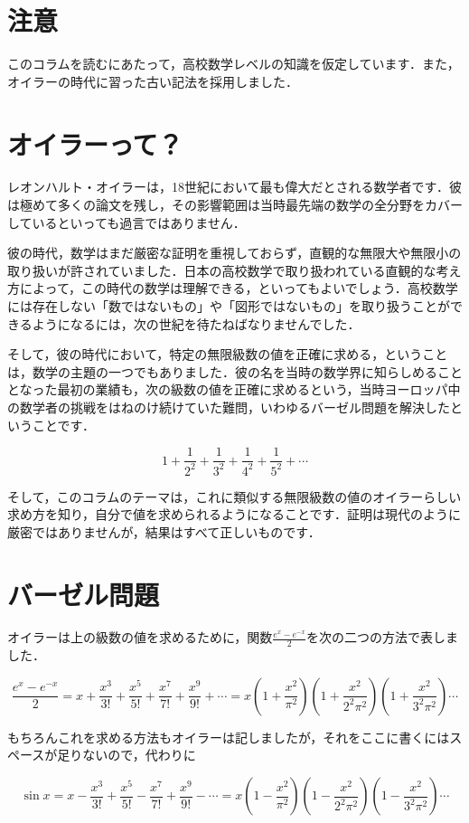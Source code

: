 \documentclass[./main]{subfiles}
\theoremstyle{break}
\begin{document}
\setcounter{section}{-1}
\section{注意}
このコラムを読むにあたって，高校数学レベルの知識を仮定しています．また，オイラーの時代に習った古い記法を採用しました．
\section{オイラーって？}
レオンハルト・オイラーは，18世紀において最も偉大だとされる数学者です．彼は極めて多くの論文を残し，その影響範囲は当時最先端の数学の全分野をカバーしているといっても過言ではありません．

彼の時代，数学はまだ厳密な証明を重視しておらず，直観的な無限大や無限小の取り扱いが許されていました．日本の高校数学で取り扱われている直観的な考え方によって，この時代の数学は理解できる，といってもよいでしょう．高校数学には存在しない「数ではないもの」や「図形ではないもの」を取り扱うことができるようになるには，次の世紀を待たねばなりませんでした．

そして，彼の時代において，特定の無限級数の値を正確に求める，ということは，数学の主題の一つでもありました．彼の名を当時の数学界に知らしめることとなった最初の業績も，次の級数の値を正確に求めるという，当時ヨーロッパ中の数学者の挑戦をはねのけ続けていた難問，いわゆるバーゼル問題を解決したということです．

\[1+\frac{1}{2^2}+\frac{1}{3^2}+\frac{1}{4^2}+\frac{1}{5^2}+\cdots\]

そして，このコラムのテーマは，これに類似する無限級数の値のオイラーらしい求め方を知り，自分で値を求められるようになることです．証明は現代のように厳密ではありませんが，結果はすべて正しいものです．
\section{バーゼル問題}
オイラーは上の級数の値を求めるために，関数$\displaystyle\frac{e^x-e^{-x}}{2}$を次の二つの方法で表しました．

\[\frac{e^x-e^{-x}}{2}=x+\frac{x^3}{3!}+\frac{x^5}{5!}+\frac{x^7}{7!}+\frac{x^9}{9!}+\cdots=x\left(  1+\frac{x^2}{\pi^2}\right)\left(  1+\frac{x^2}{2^2\pi^2}\right)\left(  1+\frac{x^2}{3^2\pi^2}\right)\cdots\]

もちろんこれを求める方法もオイラーは記しましたが，それをここに書くにはスペースが足りないので，代わりに

\[\sin x=x-\frac{x^3}{3!}+\frac{x^5}{5!}-\frac{x^7}{7!}+\frac{x^9}{9!}-\cdots=x\left(  1-\frac{x^2}{\pi^2}\right)\left(  1-\frac{x^2}{2^2\pi^2}\right)\left(  1-\frac{x^2}{3^2\pi^2}\right)\cdots\]
\end{document}
